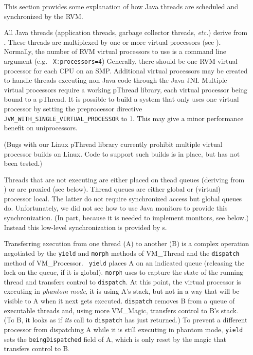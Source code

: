 This section provides some explanation of how Java threads are
scheduled and synchronized by the RVM.


All Java threads (application threads, garbage collector threads, {\em
etc.})  derive from 
.  
These threads are multiplexed by
one or more virtual processors (see 
).  Normally, the
number of RVM virtual processors to use is a command line argument
(e.g. {\tt -X:processors=4}) Generally, there should be one RVM
virtual processor for each CPU on an SMP.  Additional virtual
processors may be created to handle threads executing non Java code
through the Java JNI.  Multiple virtual processors require a working
pThread library, each virtual processor being bound to a pThread.  It
is possible to build a system that only uses one virtual processor by
setting the preprocessor directive {\tt
JVM\_WITH\_SINGLE\_VIRTUAL\_PROCESSOR} to 1.  This may give a minor
performance benefit on uniprocessors.

(Bugs with our Linux pThread library currently prohibit multiple
virtual processor builds on Linux.  Code to support such builds is in
place, but has not been tested.)

Threads that are not executing are either placed on thead queues
(deriving from 
) or are proxied (see below).
Thread queues are either global or (virtual) processor local.  The
latter do not require synchronized access but global queues do.
Unfortunately, we did not see how to use Java monitors to provide
this synchronization.  (In part, because it is needed to implement
monitors, see below.)  Instead this low-level synchronization is
provided by 
s.

Transferring execution from one thread (A) to another (B) is a complex
operation negotiated by the {\tt yield} and {\tt morph} methods of
VM\_Thread and the {\tt dispatch} method of VM\_Processor.  {\tt
yield} places A on an indicated queue (releasing the lock on the
queue, if it is global).  {\tt morph} uses 
to capture the
state of the running thread and transfers control to {\tt dispatch}.
At this point, the virtual processor is executing in {\em phantom
mode}, it is using A's stack, but not in a way that will be visible to
A when it next gets executed.  {\tt dispatch} removes B from a queue
of executable threads and, using more VM\_Magic, transfers control
to B's stack.  (To B, it looks as if {\em its} call to {\tt dispatch}
has just returned.)  To prevent a different processor from dispatching
A while it is still executing in phantom mode, {\tt yield} sets the
{\tt beingDispatched} field of A, which is only reset by the magic
that transfers control to B.


